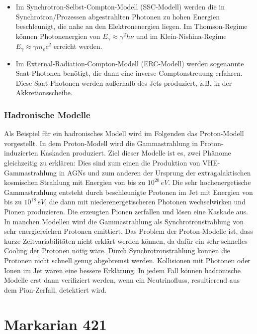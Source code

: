 \begin{itemize}
\item Im Synchrotron-Selbst-Compton-Modell (SSC-Modell) werden die in Synchrotron\-/Prozessen abgestrahlten Photonen zu hohen Energien beschleunigt, die nahe an den Elektronenergien liegen.
Im Thomson-Regime können Photonenergien von $E_{\gamma}\approx \gamma^2 h \nu$ und im Klein-Nishina-Regime $E_{\gamma}\approx \gamma m_e c^2$ erreicht werden.\cite{Weekes}
\item Im External-Radiation-Compton-Modell (ERC-Modell) werden sogenannte Saat-Photonen benötigt, die dann eine inverse Comptonstreuung erfahren.
Diese Saat-Photonen werden außerhalb des Jets produziert, z.B. in der Akkretionsscheibe.\cite{Weekes}
\end{itemize}

\subsubsection{Hadronische Modelle}
Als Beispiel für ein hadronisches Modell wird im Folgenden das Proton-Modell vorgestellt.
In dem Proton-Modell wird die Gammastrahlung in Proton-induzierten Kaskaden produziert. 
Ziel dieser Modelle ist es, zwei Phänome gleichzeitig zu erklären: 
Dies sind zum einen die Produktion von VHE-Gammastrahlung in AGNs und zum anderen der Ursprung der extragalaktischen kosmischen Strahlung mit Energien von bis zu $10^{20}\,\si{eV}$.
Die sehr hochenergetische Gammastrahlung entsteht durch beschleunigte Protonen im Jet mit Energien von bis zu $10^{18}\,\si{eV}$, die dann mit niederenergetischeren Photonen wechselwirken und Pionen produzieren.
Die erzeugten Pionen zerfallen und lösen eine Kaskade aus.
In manchen Modellen wird die Gammastrahlung als Synchrotronstrahlung von sehr energiereichen Protonen emittiert.
Das Problem der Proton-Modelle ist, dass kurze Zeitvariabilitäten nicht erklärt werden können, da dafür ein sehr schnelles Cooling der Protonen nötig wäre. 
Durch Synchrotronstrahlung können die Protonen nicht schnell genug abgebremst werden.
Kollisionen mit Photonen oder Ionen im Jet wären eine bessere Erklärung.
In jedem Fall können hadronische Modelle erst dann verifiziert werden, wenn ein Neutrinofluss, resultierend aus dem Pion-Zerfall, detektiert wird.\cite{Weekes}


\section{Markarian 421}
\label{sec:Mrk421}


